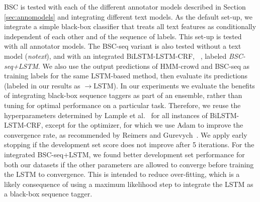 BSC is tested with each of the different annotator models described in Section \ref{sec:annomodels} and integrating different text models. 
As the default set-up, 
we integrate a simple black-box classifier
that treats all text features as conditionally independent of each other and of the sequence of labels. This set-up is tested with all annotator models.
The BSC-seq variant is also tested without a text model (\emph{notext}), 
and with an integrated BiLSTM-LSTM-CRF, ~\cite{lample2016neural}, labeled \emph{BSC-seq+LSTM}.
We also use the output predictions of HMM-crowd and BSC-seq as training labels for the same LSTM-based method,
then evaluate its predictions (labeled in our results as $\rightarrow$LSTM).
In our experiments we evaluate the benefits of integrating black-box sequence taggers
as part of an ensemble, rather than tuning for optimal performance on a particular task.
Therefore, we reuse the hyperparameters determined by Lample et al.~ 
for all instances of BiLSTM-LSTM-CRF, except for the optimizer, for which we use Adam to improve the convergence rate, as recommended by Reimers and Gurevych~.
We apply early stopping if the development set score does not improve after 5 iterations. 
For the integrated BSC-seq+LSTM,  
we found better development set performance for both our datasets if the other parameters 
are allowed to converge before training the LSTM to convergence. 
This is intended to reduce over-fitting,
which is a likely consequence of using a maximum likelihood step to integrate the LSTM as a black-box sequence tagger.
